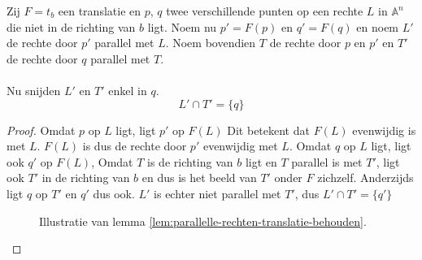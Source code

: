 \documentclass[main.tex]{subfiles}
\begin{document}
\begin{lem}
  \label{lem:parallelle-rechten-translatie-behouden}
  Zij $F = t_{b}$ een translatie en $p$, $q$ twee verschillende punten op een rechte $L$ in $\mathbb{A}^{n}$ die niet in de richting van $b$ ligt.
  Noem nu $p' = F(p)$ en $q'= F(q)$ en noem $L'$ de rechte door $p'$ parallel met $L$.
  Noem bovendien $T$ de rechte door $p$ en $p'$ en $T'$ de rechte door $q$ parallel met $T$.\\\\
  Nu snijden $L'$ en $T'$ enkel in $q$.
  \[ L' \cap T' = \{q\} \]

  \begin{proof}
    Omdat $p$ op $L$ ligt, ligt $p'$ op $F(L)$
    Dit betekent dat $F(L)$ evenwijdig is met $L$.
    $F(L)$ is dus de rechte door $p'$ evenwijdig met $L$.
    Omdat $q$ op $L$ ligt, ligt ook $q'$ op $F(L)$,
    Omdat $T$ is de richting van $b$ ligt en $T$ parallel is met $T'$, ligt ook $T'$ in de richting van $b$ en dus is het beeld van $T'$ onder $F$ zichzelf.
    Anderzijds ligt $q$ op $T'$ en $q'$ dus ook.
    $L'$ is echter niet parallel met $T'$, dus $L' \cap T' = \{ q' \}$ 
    \begin{figure}[H]
      \centering
      \caption{Illustratie van lemma \ref{lem:parallelle-rechten-translatie-behouden}.}
      \label{fig:parallelle-rechten-translatie-behouden}
    \end{figure}    
  \end{proof}
\end{lem}
\end{document}
